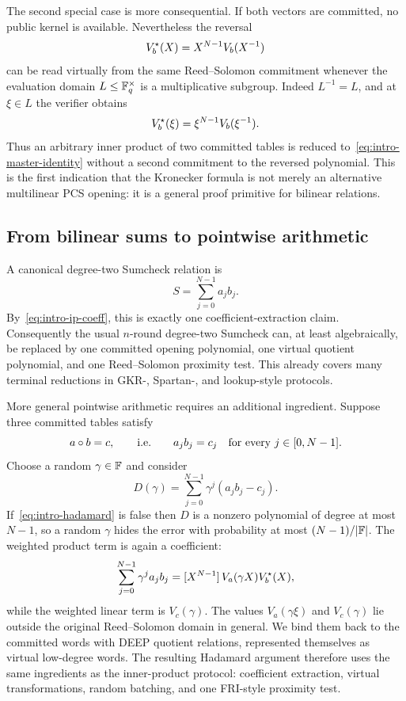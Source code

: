 The second special case is more consequential.  If both vectors are committed, no public kernel is available.  Nevertheless the reversal
\[
  V_b^{\star}(X)=X^{N-1}V_b(X^{-1})
\]
can be read virtually from the same Reed--Solomon commitment whenever the evaluation domain $L\le \mathbb{F}_q^{\times}$ is a multiplicative subgroup.  Indeed $L^{-1}=L$, and at $\xi\in L$ the verifier obtains
\begin{equation}
  V_b^{\star}(\xi)=\xi^{N-1}V_b(\xi^{-1}).
  \label{eq:intro-virtual-reversal}
\end{equation}
Thus an arbitrary inner product of two committed tables is reduced to~\eqref{eq:intro-master-identity} without a second commitment to the reversed polynomial.  This is the first indication that the Kronecker formula is not merely an alternative multilinear PCS opening: it is a general proof primitive for bilinear relations.

\subsection{From bilinear sums to pointwise arithmetic}

A canonical degree-two Sumcheck relation is
\begin{equation}
  S=\sum_{j=0}^{N-1}a_jb_j.
  \label{eq:intro-degree-two-sum}
\end{equation}
By~\eqref{eq:intro-ip-coeff}, this is exactly one coefficient-extraction claim.  Consequently the usual $n$-round degree-two Sumcheck can, at least algebraically, be replaced by one committed opening polynomial, one virtual quotient polynomial, and one Reed--Solomon proximity test.  This already covers many terminal reductions in GKR-, Spartan-, and lookup-style protocols.

More general pointwise arithmetic requires an additional ingredient.  Suppose three committed tables satisfy
\begin{equation}
  a\circ b=c,
  \qquad\text{i.e.}\qquad
  a_jb_j=c_j\quad\text{for every }j\in[0,N-1].
  \label{eq:intro-hadamard}
\end{equation}
Choose a random $\gamma\in\mathbb{F}$ and consider
\[
  D(\gamma)=\sum_{j=0}^{N-1}\gamma^j(a_jb_j-c_j).
\]
If~\eqref{eq:intro-hadamard} is false then $D$ is a nonzero polynomial of degree at most $N-1$, so a random $\gamma$ hides the error with probability at most $(N-1)/|\mathbb{F}|$.  The weighted product term is again a coefficient:
\begin{equation}
  \sum_{j=0}^{N-1}\gamma^ja_jb_j
  =[X^{N-1}]\,V_a(\gamma X)V_b^{\star}(X),
  \label{eq:intro-weighted-hadamard}
\end{equation}
while the weighted linear term is $V_c(\gamma)$.  The values $V_a(\gamma\xi)$ and $V_c(\gamma)$ lie outside the original Reed--Solomon domain in general.  We bind them back to the committed words with DEEP quotient relations, represented themselves as virtual low-degree words.  The resulting Hadamard argument therefore uses the same ingredients as the inner-product protocol: coefficient extraction, virtual transformations, random batching, and one FRI-style proximity test.

